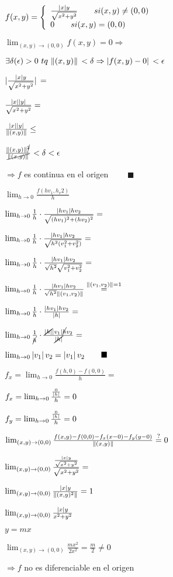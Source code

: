 \documentclass[../practica_04.tex]{subfiles}
\begin{document}
    $ f(x,y) = \left\{
    \begin{array}{ll}
        \frac{\abs*{x}y}{\sqrt{x^2+y^2}} \qquad si (x,y) \neq (0,0)\\
        0 \qquad si (x,y) = (0,0)\\
    \end{array}
    \right.$

    $ \lim_{(x,y) \to (0,0)} f(x,y) = 0 \Rightarrow $

    $ \exists \delta(\epsilon) >0\ tq\ \norm*{(x,y)} < \delta \Rightarrow \abs*{f(x,y)-0} < \epsilon$

    $\abs*{\frac{\abs*{x}y}{\sqrt{x^2+y^2}}} = $

    $\frac{\abs*{x}\abs*{y}}{\sqrt{x^2+y^2}} = $
    
    $\frac{\abs*{x}\abs*{y}}{\norm*{(x,y)}} \leq $

    $\frac{\norm*{(x,y)}\cancel{^2}}{\cancel{\norm*{(x,y)}}} < \delta < \epsilon$

    $\Rightarrow f$ es continua en el origen $\qquad \blacksquare$

    $\lim_{h\to 0} \frac{f(hv_1, h_v2)}{h} $

    $\lim_{h\to 0} \frac{1}{h} \cdot \frac{\abs*{hv_1}hv_2}{\sqrt{(hv_1)^2+(hv_2)^2}} = $
    
    $\lim_{h\to 0} \frac{1}{h} \cdot \frac{\abs*{hv_1}hv_2}{\sqrt{h^2(v_1^2+v_2^2)}} = $

    $\lim_{h\to 0} \frac{1}{h} \cdot \frac{\abs*{hv_1}hv_2}{\sqrt{h^2}\sqrt{v_1^2+v_2^2}} = $
    
    $\lim_{h\to 0} \frac{1}{h} \cdot \frac{\abs*{hv_1}hv_2}{\sqrt{h^2}\norm*{(v_1,v_2)}} \stackrel{\norm*{(v_1,v_2)}=1}{=} $
    
    $\lim_{h\to 0} \frac{1}{h} \cdot \frac{\abs*{hv_1}hv_2}{\abs*{h}} = $

    $\lim_{h\to 0} \frac{1}{\cancel{h}} \cdot \frac{\cancel{\abs*{h}}\abs*{v_1}\cancel{h}v_2}{\cancel{\abs*{h}}} = $

    $\lim_{h\to 0} \abs*{v_1}v_2 = \abs*{v_1}v_2 \qquad \blacksquare$

    $f_x = \lim_{h \to 0} \frac{f(h,0)- f(0,0)}{h} =  $

    $f_x = \lim_{h \to 0} \frac{\frac{0}{\abs*{h}}}{h} = 0 $

    $f_y = \lim_{h \to 0} \frac{\frac{0}{\abs*{h}}}{h} = 0 $

    $\lim_{(x,y) \to (0,0)} \frac{f(x,y) - f(0,0) - f_x(x-0) - f_y(y-0)}{\norm*{(x,y)}} \stackrel{?}{=} 0 $

    $\lim_{(x,y) \to (0,0)} \frac{\frac{\abs*{x}y}{\sqrt{x^2+y^2}}}{\sqrt{x^2+y^2}} = $

    $\lim_{(x,y) \to (0,0)} \frac{\abs*{x}y}{\norm{(x,y)^2}} = 1 $

    $ \lim_{(x,y) \to (0,0)} \frac{\abs*{x}y}{x^2+y^2} $

    $ y = mx $

    $ \lim_{(x,y) \to (0,0)} \frac{mx^2}{2x^2} = \frac{m}{2} \neq 0$

    $\Rightarrow f$ no es diferenciable en el origen
\end{document}
